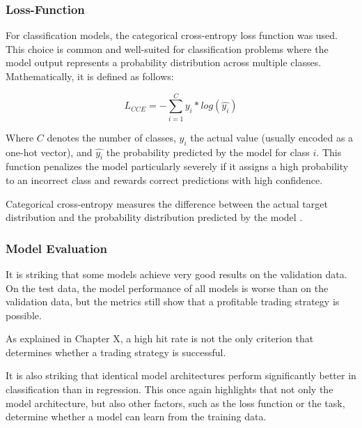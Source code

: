 \subsubsection{Loss-Function}

For classification models, the categorical cross-entropy loss function was used.
This choice is common and well-suited for classification problems where the model output represents a probability distribution across multiple classes.
Mathematically, it is defined as follows:

\[
    L_{CCE} = -\sum_{i=1}^{C} y_i*log(\hat{y_i})
\]

Where $C$ denotes the number of classes, $y_i$ the actual value (usually encoded as a one-hot vector), and $\hat{y_i}$ the probability predicted by the model for class $i$.
This function penalizes the model particularly severely if it assigns a high probability to an incorrect class and rewards correct predictions with high confidence.

Categorical cross-entropy measures the difference between the actual target distribution and the probability distribution predicted by the model \cite{springer-ml-basics}.

\subsubsection{Model Evaluation}


%    

It is striking that some models achieve very good results on the validation data.
On the test data, the model performance of all models is worse than on the validation data, but the metrics still show that a profitable trading strategy is possible.

As explained in Chapter X, a high hit rate is not the only criterion that determines whether a trading strategy is successful.

It is also striking that identical model architectures perform significantly better in classification than in regression.
This once again highlights that not only the model architecture, but also other factors, such as the loss function or the task, determine whether a model can learn from the training data.